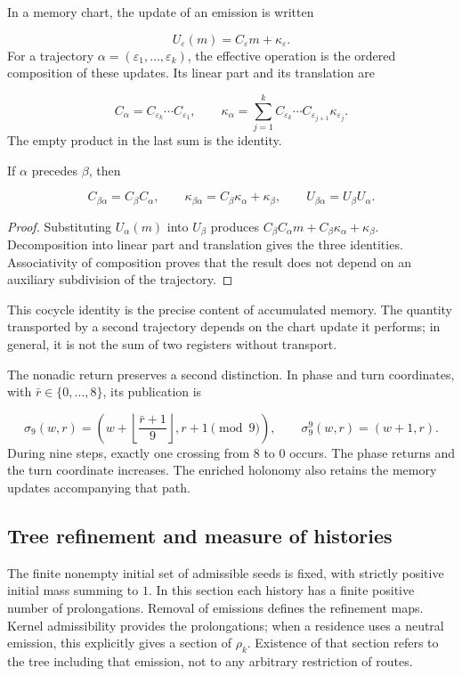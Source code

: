 In a memory chart, the update of an emission is written

\[
U_\varepsilon(m)=C_\varepsilon m+\kappa_\varepsilon.
\]
For a trajectory \(\alpha=(\varepsilon_1,\ldots,\varepsilon_k)\), the effective operation is the ordered composition of these updates. Its linear part and its translation are

\[
C_\alpha=C_{\varepsilon_k}\cdots C_{\varepsilon_1},
\qquad
\kappa_\alpha=
\sum_{j=1}^{k}C_{\varepsilon_k}\cdots
C_{\varepsilon_{j+1}}\kappa_{\varepsilon_j}.
\]
The empty product in the last sum is the identity.

\begin{proposition}
\label{x_reciprocidad:iv:cont:concatenacion}
If \(\alpha\) precedes \(\beta\), then

\[
C_{\beta\alpha}=C_\beta C_\alpha,
\qquad
\kappa_{\beta\alpha}=C_\beta\kappa_\alpha+\kappa_\beta,
\qquad
U_{\beta\alpha}=U_\beta U_\alpha.
\]
\end{proposition}
\begin{proof}
Substituting \(U_\alpha(m)\) into \(U_\beta\) produces \(C_\beta C_\alpha m+C_\beta\kappa_\alpha+\kappa_\beta\). Decomposition into linear part and translation gives the three identities. Associativity of composition proves that the result does not depend on an auxiliary subdivision of the trajectory.
\end{proof}

This cocycle identity is the precise content of accumulated memory. The quantity transported by a second trajectory depends on the chart update it performs; in general, it is not the sum of two registers without transport.

The nonadic return preserves a second distinction. In phase and turn coordinates, with \(\bar r\in\{0,\ldots,8\}\), its publication is

\[
\sigma_9(w,r)=
\left(w+\left\lfloor\frac{\bar r+1}{9}\right\rfloor,
r+1\pmod9\right),
\qquad
\sigma_9^9(w,r)=(w+1,r).
\]
During nine steps, exactly one crossing from \(8\) to \(0\) occurs. The phase returns and the turn coordinate increases. The enriched holonomy also retains the memory updates accompanying that path.

\subsection{Tree refinement and measure of histories}
\label{x_reciprocidad:iv:cont:medida}
The finite nonempty initial set of admissible seeds is fixed, with strictly positive initial mass summing to \(1\). In this section each history has a finite positive number of prolongations. Removal of emissions defines the refinement maps. Kernel admissibility provides the prolongations; when a residence uses a neutral emission, this explicitly gives a section of \(\rho_k\). Existence of that section refers to the tree including that emission, not to any arbitrary restriction of routes.

